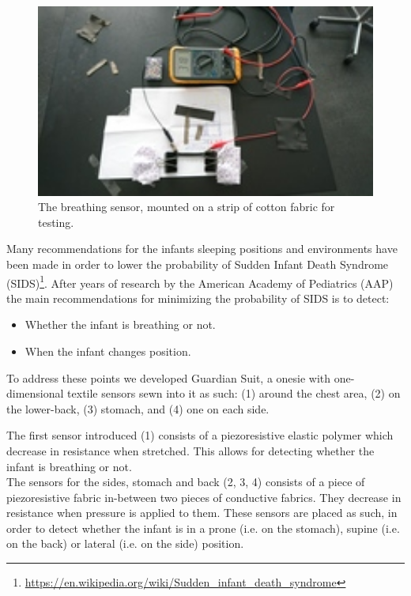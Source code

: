 \documentclass{sigchi-ext}
\begin{document}
{{\begin{minipage}{0.925\marginparwidth}
\begin{figure} [H]
\end{figure}
      \begin{figure} [H]
    \includegraphics[width=1.0\textwidth]{img/resize/w200/stretch_test_setup}
    \caption{The breathing sensor, mounted on a strip of cotton fabric for testing.}
\end{figure}
    \end{minipage}}\label{sec:sidebar} }

Many recommendations for the infants sleeping positions and environments have been made in order to lower the probability of Sudden Infant Death Syndrome (SIDS)\footnote{\url{https://en.wikipedia.org/wiki/Sudden_infant_death_syndrome}}. After years of research by the American Academy of Pediatrics (AAP) \cite{aap-1992,aap-1996,aap-2005} the main recommendations for minimizing the probability of SIDS is to detect:
\begin{itemize}
  \item Whether the infant is breathing or not.
  \item When the infant changes position.
\end{itemize}
To address these points we developed Guardian Suit, a onesie with one-dimensional textile sensors sewn into it as such: (1) around the chest area, (2) on the lower-back, (3) stomach, and (4) one on each side.

The first sensor introduced (1) consists of a piezoresistive elastic polymer
which decrease in resistance when stretched. This allows for detecting whether
the infant is breathing or not.\\
The sensors for the sides, stomach and back (2, 3, 4) consists of a piece of
piezoresistive fabric in-between two pieces of conductive fabrics. 
They decrease in resistance when pressure is applied to them. 
These sensors are placed as such, in order to detect whether the infant is in a
prone (i.e. on the stomach), supine (i.e. on the back) or lateral (i.e. on the
side) position.
\end{document}
